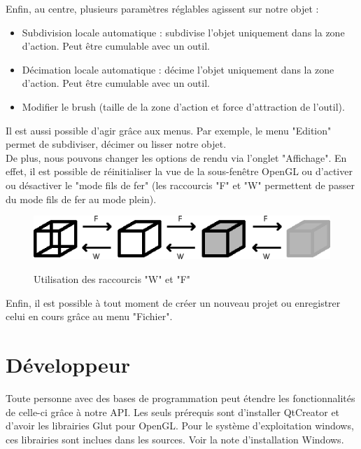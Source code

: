 \documentclass[a4paper]{memoir}
\begin{document}
			Enfin, au centre, plusieurs paramètres réglables agissent sur notre objet : 
			\begin{itemize}
				\item Subdivision locale automatique : subdivise l'objet uniquement dans la zone d'action. Peut être cumulable avec un outil.
				\item Décimation locale automatique : décime l'objet uniquement dans la zone d'action. Peut être cumulable avec un outil.
				\item Modifier le brush (taille de la zone d'action et force d'attraction de l'outil).
			\end{itemize}
			Il est aussi possible d'agir grâce aux menus. Par exemple, le menu "Edition" permet de subdiviser, décimer ou lisser notre objet.\\
			De plus, nous pouvons changer les options de rendu via l'onglet "Affichage". En effet, il est possible de réinitialiser la vue de la 
			sous-fenêtre OpenGL ou d'activer ou désactiver le "mode fils de fer" (les raccourcis "F" et "W" permettent de passer du mode fils de fer 
			au mode plein).
			\begin{figure}[H]
				\begin{center}
					\includegraphics[scale=0.8]{img/wire-fill.png}
					\label{fig:wire-fill}
					\caption{Utilisation des raccourcis "W" et "F"}
				\end{center}
			\end{figure}
			Enfin, il est possible à tout moment de créer un nouveau projet ou enregistrer celui en cours grâce au menu "Fichier".

		\section{Développeur}
			\label{man-dev}
			Toute personne avec des bases de programmation peut étendre les fonctionnalités de celle-ci grâce à notre API. Les seuls prérequis sont 
			d'installer QtCreator et d'avoir les librairies Glut pour OpenGL. Pour le système d'exploitation windows, ces librairies sont inclues dans les 
			sources. Voir la note d'installation Windows.
			
\end{document}
